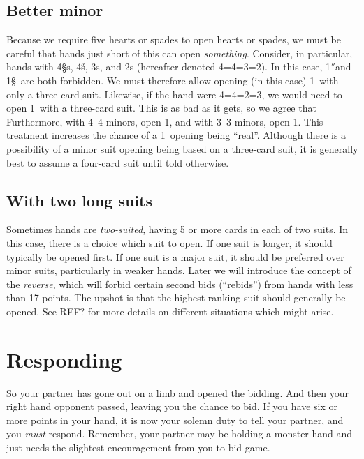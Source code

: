 \documentclass[oneside]{memoir}
\begin{document}
\subsection{Better minor}
Because we require five hearts or spades to open hearts or spades, we must
be careful that hands just short of this can open \textit{something}.  Consider,
in particular, hands with 4\S s, 4\H s, 3\D s, and 2\C s (hereafter denoted
4=4=3=2).  In this case, 1\H\ and 1\S\ are both forbidden.  We must therefore
allow opening (in this case) 1\D\ with only a three-card suit.  Likewise, if
the hand were 4=4=2=3, we would need to open 1\C\ with a three-card suit.
This is as bad as it gets, so we agree that
Furthermore, with 4--4 minors, open 1\D, and with 3--3 minors, open 1\C.
This treatment increases the chance of a 1\D\ opening being ``real''.
Although there is a possibility of a minor suit opening being based on
a three-card suit, it is generally best to assume a four-card suit until
told otherwise.

\subsection{With two long suits}
Sometimes hands are \textit{two-suited}, having 5 or more cards in each of
two suits.  In this case, there is a choice which suit to open.  If one
suit is longer, it should typically be opened first.  If one suit is a
major suit, it should be preferred over minor suits, particularly in
weaker hands.  Later we will introduce the concept of the \textit{reverse},
which will forbid certain second bids (``rebids'') from hands with less
than 17 points.  The upshot is that the highest-ranking suit should generally
be opened.  See REF? for more details on different situations which might
arise.

\section{Responding}

So your partner has gone out on a limb and opened the bidding.  And then
your right hand opponent passed, leaving you the chance to bid.  If you
have six or more points in your hand, it is now your solemn duty to tell
your partner, and you \textit{must} respond.  Remember, your partner may
be holding a monster hand and just needs the slightest encouragement from
you to bid game.
\end{document}
